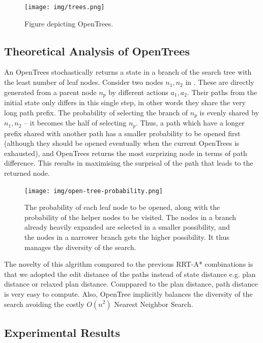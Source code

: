 \begin{figure}[htbp]
 \centering
 \texttt{[image: img/trees.png]}
 \caption{Figure depicting OpenTrees.}
 \label{trees}
\end{figure}

\subsection{Theoretical Analysis of OpenTrees}

An OpenTrees stochastically returns a state in a branch of the search tree with the least number of leaf nodes. Consider two nodes $n_1,n_2$ in . These are directly generated from a parent node $n_p$ by different actions $a_1,a_2$. Their paths from the initial state only differs in this single step, in other words they share the very long path prefix. The probability of selecting the branch of $n_p$ is evenly shared by $n_1,n_2$ -- it becomes the half of selecting $n_p$. Thus, a path which have a longer prefix shared with another path has a smaller probability to be opened first (although they should be opened eventually when the current OpenTrees is exhausted), and OpenTrees returns the most surprizing node in terms of path difference.
This results in maximising the surprisal of the path that leads to the returned node.

\begin{figure}[htbp]
 \centering
 \texttt{[image: img/open-tree-probability.png]}
 \caption{The probability of each leaf node to be opened, along with the probability of the helper nodes to be visited. The nodes in a branch already heavily expanded are selected in a smaller possibility, and the nodes in a narrower branch gets the higher possibility. It thus manages the diversity of the search.}
 \label{probability}
\end{figure}

The novelty of this algrithm compared to the previous RRT-A* combinations is that we adopted the edit distance of the paths instead of state distance e.g. plan distance or relaxed plan distance.
Comppared to the plan distance, path distance is very easy to compute. Also, OpenTree implicitly balances the diversity of the search avoiding the costly $O(n^2)$ Nearest Neighbor Search.

\subsection{Experimental Results}
\label{sec-3}

